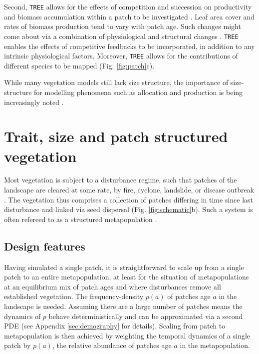 \documentclass[a4paper,11pt]{article}
\begin{document}
Second, \texttt{TREE} allows for the effects of competition and succession on
productivity and biomass accumulation within a patch to be investigated
\citep{Falster-2011}. Leaf area cover and rates of biomass production
tend to vary with patch age. Such changes might come about via a
combination of physiological and structural changes
\citep{Binkley-2002, Smith-2001, Ogawa-2010, Coomes-2007}. \texttt{TREE} enables
the effects of competitive feedbacks to be incorporated, in addition to
any intrinsic physiological factors. Moreover, \texttt{TREE} allows for the
contributions of different species to be mapped (Fig. \ref{fig:patch}c).

While many vegetation models still lack size structure, the importance of
size-structure for modelling phenomena such as allocation and production is
being increasingly noted \citep{Moorcroft-2001, Dekauwe-2014, Falster-2011}.

\section{Trait, size and patch structured vegetation}

Most vegetation is subject to a disturbance regime, such that patches of
the landscape are cleared at some rate, by fire, cyclone, landslide, or
disease outbreak
\citep{Connell-1978, White-1979, Chambers-2013, Bormann-1979, Clark-1991, Coomes-2007}.
The vegetation thus comprises a collection of patches differing in time
since last disturbance and linked via seed dispersal (Fig.
\ref{fig:schematic}b). Such a system is often refereed to as a
structured metapopulation \citep{Gyllenberg-2001}.

\subsection{Design features}

Having simulated a single patch, it is straightforward to scale up from
a single patch to an entire metapopulation, at least for the situation
of metapopulations at an equilibrium mix of patch ages and where
disturbances remove all established vegetation. The frequency-density
\(p(a)\) of patches age \(a\) in the landscape is needed. Assuming there
are a large number of patches means the dynamics of \(p\) behave
deterministically and can be approximated via a second PDE
\citep{Vonfoerster-1959, Mckendrick-1926} (see Appendix
\ref{sec:demography} for
details). Scaling from patch to metapopulation is then achieved by
weighting the temporal dynamics of a single patch by \(p(a)\), the
relative abundance of patches age \(a\) in the metapopulation.
\end{document}
